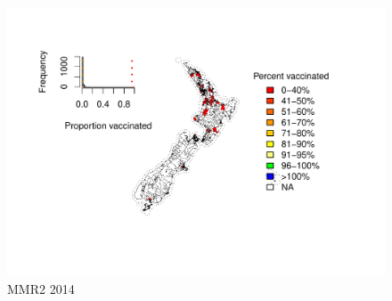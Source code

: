 \documentclass{article}
\begin{document}
\begin{figure}
    \centering
    \includegraphics[width=5.0in]{nir_census_MMR2_NIR_2014.pdf}
    \caption{MMR2 2014}
\end{figure}
\end{document}
